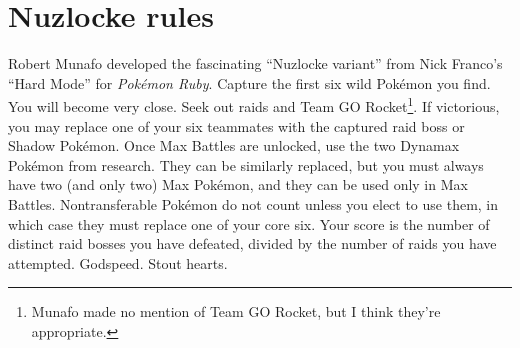 \section{Nuzlocke rules}
Robert Munafo developed the fascinating ``Nuzlocke variant'' from Nick Franco's ``Hard Mode''
 for \textit{Pokémon Ruby}.
Capture the first six wild Pokémon you find.
You will become very close.
Seek out raids and Team GO Rocket\footnote{Munafo made no mention of Team GO Rocket, but I think they're appropriate.}.
If victorious, you may replace one of your six teammates with the captured raid boss or Shadow Pokémon.
Once Max Battles are unlocked, use the two Dynamax Pokémon from research.
They can be similarly replaced, but you must always have two (and only two) Max Pokémon, and they can be used only in Max Battles.
Nontransferable Pokémon do not count unless you elect to use them, in which case they
 must replace one of your core six.
Your score is the number of distinct raid bosses you have defeated, divided by the number of raids you have attempted.
Godspeed. Stout hearts.
